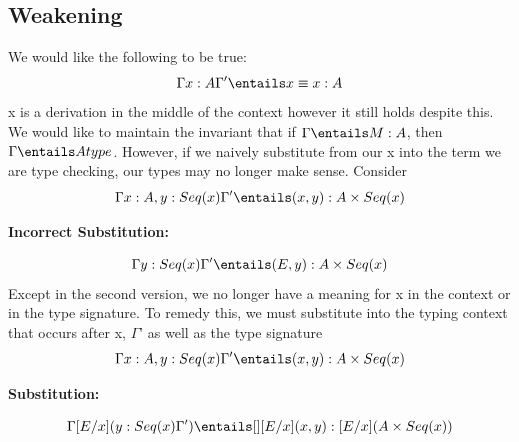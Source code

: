 \documentclass[11pt]{article}
\begin{document}
\subsection*{Weakening}
We would like the following to be true:
$$\Gamma x : A \Gamma' \entails x \equiv x: A$$
x is a derivation in the middle of the context however it still holds despite this.  We would like to maintain the invariant that if $\Gamma \entails M : A$, then $\Gamma \entails A type$. However, if we naively substitute from our x into the term we are type checking, our types may no longer make sense. Consider
$$\Gamma x : A, y : Seq(x) \Gamma' \entails (x, y) : A \times Seq(x)$$
\begin{center} \textbf{Incorrect Substitution:} \end{center}
$$\Gamma y : Seq(x) \Gamma' \entails (E, y) : A \times Seq(x)$$
Except in the second version, we no longer have a meaning for x in the context or in the type signature. To remedy this, we must substitute into the typing context that occurs after x, $\Gamma$' as well as the type signature
$$\Gamma x : A, y : Seq(x) \Gamma' \entails (x, y) : A \times Seq(x)$$
\begin{center} \textbf{Substitution:} \end{center}
$$\Gamma [E/x](y : Seq(x) \Gamma') \entails [][E/x](x, y) : [E/x](A \times Seq(x))$$
\end{document}

